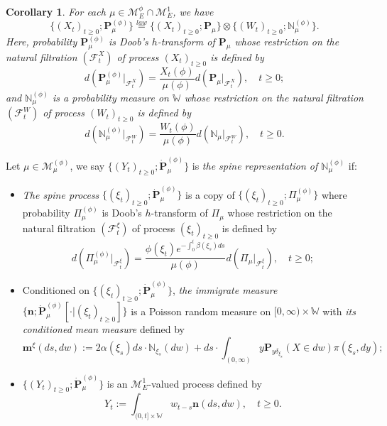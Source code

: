 \documentclass[12pt, a4paper]{amsart}
\newtheorem{cro}[thm]{Corollary}
\theoremstyle{definition}
\numberwithin{equation}{section}
\begin{document}
\begin{cro}
	For each $\mu \in \mathcal M_E^\phi \cap \mathcal M_E^1$, we have
\[
	\{(X_t)_{t\geq 0}; \mathbf P_\mu^{(\phi)}\}
	\overset{law}{=} \{(X_t)_{t\geq 0}; \mathbf P_\mu \} \otimes \{(W_t)_{t\geq 0}; \mathbb N^{(\phi)}_\mu\}.
\]
	Here, probability $\mathbf P_\mu^{(\phi)}$ is Doob's $h$-transform of $\mathbf P_\mu$ whose restriction on the natural filtration $(\mathscr F_t^X)$ of process $(X_t)_{t\geq 0}$ is defined by
\[
	d ( \mathbf P_\mu^{(\phi)}|_{\mathscr F_t^X}) = \frac{X_t(\phi)}{ \mu(\phi)} d(\mathbf P_\mu|_{\mathscr F_t^X}),
	\quad t\geq 0;
\]
	and $\mathbb N_\mu^{(\phi)}$ is a probability measure on $\mathbb W$ whose restriction on the natural filtration $(\mathscr F_t^W)$ of process $(W_t)_{t\geq 0}$ is defined by
\[
	d(\mathbb N_\mu^{(\phi)} |_{\mathscr F^W_t}  )
	= \frac{W_t(\phi)}{\mu(\phi)} d(\mathbb N_\mu |_{\mathscr F^W_t}  ),
	\quad t\geq 0.
\] 
\end{cro}

	Let $\mu \in \mathcal M^{(\phi)}_\mu$, we say $\{(Y_t)_{ t\geq 0}; \dot {\mathbf P}^{(\phi)}_\mu\}$ is \emph{the spine representation of $\mathbb N^{(\phi)}_\mu$}  if:
\begin{itemize}
\item
	\emph{The spine process} $\{(\xi_t)_{t\geq 0}; \dot{\mathbf P}^{(\phi)}_\mu\}$ is a copy of $\{(\xi_t)_{t\geq 0}; \Pi^{(\phi)}_{\mu}\}$ where probability $\Pi_{\mu}^{(\phi)}$ is Doob's $h$-transform of $\Pi_\mu$ whose restriction on the natural filtration $(\mathscr F_t^\xi)$ of process $(\xi_t)_{t\geq 0}$ is defined by
\[
	d(\Pi_{\mu}^{(\phi)} |_{\mathscr F_t^\xi}) 
	= \frac{\phi(\xi_t)e^{-\int_0^t \beta(\xi_s)ds}}{\mu(\phi)} d(\Pi_{\mu} |_{\mathscr F_t^\xi}),
	\quad t\geq 0;
\]
\item
	Conditioned on $\{(\xi_t)_{t\geq 0}; \dot{\mathbf P}^{(\phi)}_\mu\}$, \emph{the immigrate measure} $\{\mathbf n; \dot{\mathbf P}^{(\phi)}_\mu[\cdot |(\xi_t)_{t\geq 0}]\}$ is a Poisson random measure on $[0,\infty ) \times \mathbb W$ with \emph{its conditioned mean measure} defined by
\[\label{eq:meanMeasImmigr}
	\mathbf m^\xi(ds,dw)
	:= 2 \alpha(\xi_s) ds \cdot \mathbb N_{\xi_s}(dw) + ds \cdot \int_{(0,\infty)} y \mathbf P_{y\delta_{\xi_s}}(X\in dw) \pi(\xi_s,dy);
\]
\item
	$\{(Y_t)_{t\geq 0}; \dot{\mathbf P}^{(\phi)}_\mu\}$ is an $\mathcal M^1_E$-valued process defined by
\[\label{eq:defSpinImmigr}
	Y_t
	:= \int_{(0,t] \times \mathbb W} w_{t-s} \mathbf n(ds,dw),
	\quad t\geq 0.
\]
\end{itemize}
\end{document}
